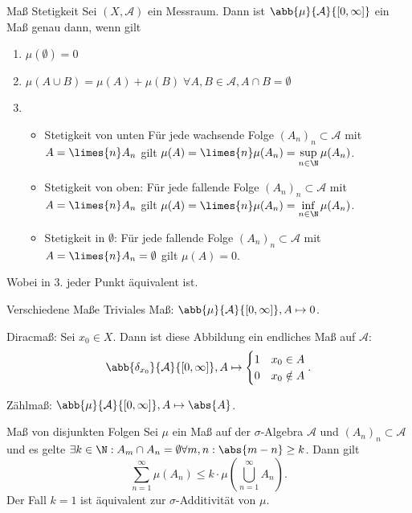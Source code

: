 \begin{karte}{Maß Stetigkeit}
	Sei \( (X, \mathcal{A}) \) ein Messraum. Dann ist \( \abb{\mu}{\mathcal{A}}{[0,\infty]} \) ein Maß genau dann, wenn gilt 
	\begin{enumerate}
		\item \(\mu(\emptyset) = 0\)
		\item \( \mu(A\cup B) = \mu(A) + \mu(B) \;\forall A,B\in \mathcal{A}, A\cap B = \emptyset \)
		\item \begin{itemize}
			\item Stetigkeit von unten Für jede wachsende Folge \( (A_n)_n \subset \mathcal{A} \) mit \(A = \limes{n} A_n\) gilt \(\mu(A) = \limes{n} \mu(A_n) = \sup\limits_{n\in\N} \mu(A_n) \).
			\item Stetigkeit von oben: Für jede fallende Folge \( (A_n)_n \subset \mathcal{A} \) mit \(A = \limes{n} A_n\) gilt \(\mu(A) = \limes{n} \mu(A_n) = \inf\limits_{n\in\N} \mu(A_n) \).
			\item Stetigkeit in \(\emptyset\): Für jede fallende Folge \( (A_n)_n \subset \mathcal{A} \) mit \( A = \limes{n} A_n = \emptyset \) gilt \( \mu(A) = 0 \).
		\end{itemize}
	\end{enumerate}
	Wobei in 3. jeder Punkt äquivalent ist.
\end{karte}

\begin{karte}{Verschiedene Maße}
	Triviales Maß: \( \abb{\mu}{\mathcal{A}}{[0,\infty]}, A \mapsto 0 \).
	
	Diracmaß: Sei \( x_0 \in X \). Dann ist diese 
	Abbildung ein endliches Maß auf \(\mathcal{A}\):
	\[ \abb{\delta_{x_0}}{\mathcal{A}}{[0,\infty]}, 
	A \mapsto \begin{cases}
		1 &x_0 \in A \\
		0 & x_0 \notin A
	\end{cases}. \]

	
	Zählmaß: \( \abb{\mu}{\mathcal{A}}{[0,\infty]}, A \mapsto \abs{A} \).
\end{karte}

\begin{karte}{Maß von disjunkten Folgen}
	Sei \(\mu\) ein Maß auf der \(\sigma\)-Algebra \(\mathcal{A}\) und \( (A_n)_n \subset \mathcal{A} \) 
	und es gelte \( \exists k\in \N: A_m \cap A_n = \emptyset \forall m,n: \abs{m-n}\geq k \). Dann gilt 
	\[ \sum_{n=1}^{\infty} \mu(A_n) \leq k \cdot \mu \left( \bigcup_{n=1}^\infty A_n \right). \]
	Der Fall \(k = 1\) ist äquivalent zur \(\sigma\)-Additivität von \(\mu\).
\end{karte}